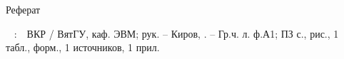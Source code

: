 
{

\vspace{0.8cm}
\begin{center}
	Реферат
\end{center}

\vspace{1em}

\authorwithinitials\
\topic
:\
\mbox{\tpga}\
ВКР / ВятГУ, каф. ЭВМ; рук.
\supervisor – Киров, \the\year. –
Гр.ч. \numberofposters л. ф.А1;
ПЗ
\total{page} с.,
 рис.,
1 табл.,
 форм.,
1 источников,
1 прил.

\vspace{1.5em}


\vspace{1.5em}

 {
	
}

}
